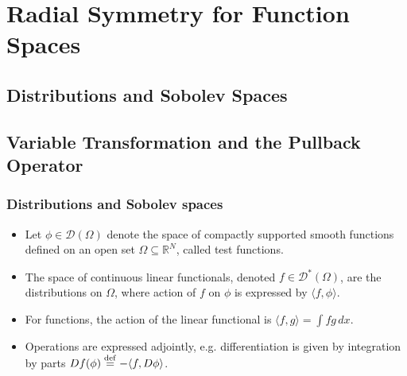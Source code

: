 \documentclass[]{beamer}
\newcommand{\eps}{\varepsilon}
\newcommand{\R}{\ensuremath{\mathbb R}}  %
\newcommand{\DD}{\ensuremath{\mathscr D}}
\newcommand{\eqdef}{\stackrel{\rm def}{=}}
\newcommand{\bm}[1]{\mbox{\boldmath$#1$}}
\newcommand{\vect}[1]{\bm{#1}}
\begin{document}


\section{Radial Symmetry for Function Spaces}
\subsection{Distributions and Sobolev Spaces}
\subsection{Variable Transformation and the Pullback Operator}
\begin{frame}[t]
  \frametitle{Distributions and Sobolev spaces}
  \begin{itemize}
    \itemsep 1.2em
  \item Let $\phi \in \DD(\Omega)$ denote the space of compactly supported smooth functions defined on an open set $\Omega \subseteq \R^N$, called \alert{test functions}.
  \item The space of continuous linear functionals, denoted $f \in \DD^*(\Omega)$, are the \alert{distributions} on $\Omega$, where action of $f$ on $\phi$ is expressed by \alert{$\langle f, \phi\rangle$}.
  \item For functions, the action of the linear functional is \alert{$\langle f,g\rangle = \int f g\,dx$}.
  \item Operations are expressed adjointly, e.g. differentiation is given by integration by parts \alert{$Df(\phi) \eqdef -\langle f, D\phi \rangle$}.
  \end{itemize}
\end{frame}
\end{document}
